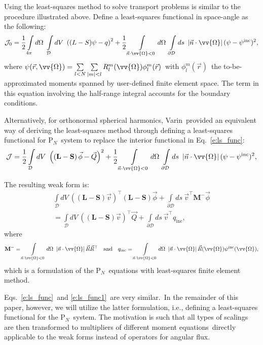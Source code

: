 \documentclass[review]{elsarticle}
\newcommand{\psii}[1]{\psi^\mathrm{inc}_\mathrm{{#1}}}
\newcommand{\pn}{P$_N$}
\newcommand{\pd}{{\partial\mathcal{D}}}
\newcommand{\intli}[1]{\int\limits_{{#1}}}
\newcommand{\ndo}{\vec{n}\cdot\ome}
\newcommand{\absndo}{\left|\ndo\right|}
\newcommand{\intd}{\int\limits_\mathcal{D}dV\ }
\newcommand{\intfpd}{\int\limits_{4\pi}d\Omega\ \int\limits_\mathcal{D}dV\ }
\newcommand{\ome}{\vv{\Omega}}
\newcommand{\dome}{d\Omega}
\newcommand{\lp}{\left(}
\newcommand{\rp}{\right)}
\newcommand{\bs}{\mathbf{S}}
\newcommand{\bl}{\mathbf{L}}
\newcommand{\half}{\frac{1}{2}}
\newcommand{\bmm}{\mathbf{M}^-}
\newcommand{\vq}{\vec{Q}}
\newcommand{\vphi}{\vec{\phi}}
\newcommand{\vt}{\vec{v}}
\newcommand{\qin}{q_\mathrm{inc}}
\newcommand{\quand}{\quad\mathrm{and}\quad}
\begin{document}
Using the least-squares method to solve transport problems is similar to the procedure illustrated above. Define a least-squares functional in space-angle as the following:
\begin{equation}\label{e:ls_func}
\mathcal{J}_0=\half\intfpd\lp(L-S)\psi-q\rp^2+\half\intli{\ndo<0}\dome\ \intli{\pd}ds\ \absndo(\psi-\psii{})^2,
\end{equation}
where $\psi(\vec{r},\ome)=\sum\limits_{l<N}\sum\limits_{|m|<l}R_l^m(\ome)\phi_l^m(\vec{r})$\ with $\phi_l^m(\vec{r})$\ the to-be-approximated moments spanned by user-defined finite element space. The term in this equation involving the half-range integral accounts for the boundary conditions.

Alternatively, for orthonormal spherical harmonics, Varin\cite{varin_dissertation}\ provided an equivalent way of deriving the least-squares method through defining a least-squares functional for \pn\ system to replace the interior functional in Eq.\ \eqref{e:ls_func}:
\begin{equation}\label{e:ls_func1}
\mathcal{J}=\half\intd\left(\left(\bl-\bs\right)\vphi-\vq\right)^2+\half\intli{\ndo<0}\dome\ \intli{\pd}ds\ \absndo(\psi-\psii{})^2,
\end{equation}

The resulting weak form is:
\begin{align}\label{e:ls_weak1}
\intd\left((\bl-\bs)\vec{v}\right)^\top(\bl-\bs)\vec{\phi}+\intli{\pd}ds\ \vt^\top\bmm\vphi\nonumber\\
=\intd\left((\bl-\bs)\vec{v}\right)^\top\vq+\intli{\pd}ds\ \vt^\top\qin,
\end{align}
where
\begin{align}
\bmm=\intli{\ndo<0}\dome\ \absndo\vec{R}\vec{R}^\top\quand\qin=\intli{\ndo<0}\dome\ \absndo\vec{R}(\ome)\psi^\mathrm{inc}(\ome),
\end{align}
which is a formulation of the \pn\ equations with least-squares finite element method.

Eqs.\ \eqref{e:ls_func}\ and \eqref{e:ls_func1}\ are very similar.\ In the remainder of this paper, however, we will utilize the latter formulation, i.e., defining a least-squares functional for the \pn\ system. The motivation is such that all types of scalings are then transformed to multipliers of different moment equations\cite{varin_dissertation,ressel_dissertation}\ directly applicable to the weak forms instead of operators for angular flux.
\end{document}
